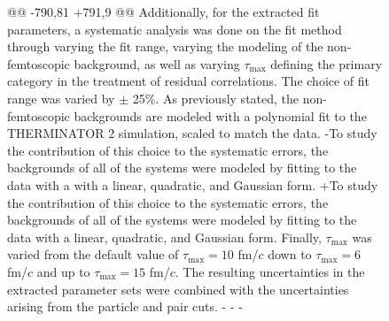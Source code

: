 \begin{figure}[h]
{@@ -790,81 +791,9 @@
 Additionally, for the extracted fit parameters, a systematic analysis was done on the fit method through varying the \kstar fit range, varying the modeling of the non-femtoscopic background, as well as varying $\tau_{\mathrm{max}}$ defining the primary category in the treatment of residual correlations.
 The choice of \kstar fit range was varied by $\pm$ 25\%. 
 As previously stated, the non-femtoscopic backgrounds are modeled with a polynomial fit to the THERMINATOR 2 simulation, scaled to match the data.
-To study the contribution of this choice to the systematic errors, the backgrounds of all of the systems were modeled by fitting to the data with a with a linear, quadratic, and Gaussian form.
+To study the contribution of this choice to the systematic errors, the backgrounds of all of the systems were modeled by fitting to the data with a linear, quadratic, and Gaussian form.
 Finally, $\tau_{\mathrm{max}}$ was varied from the default value of $\tau_{\mathrm{max}} = 10$ fm/$c$ down to $\tau_{\mathrm{max}} = 6$ fm/$c$ and up to $\tau_{\mathrm{max}} = 15$ fm/$c$.
 The resulting uncertainties in the extracted parameter sets were combined with the uncertainties arising from the particle and pair cuts.
-
-%
-\begin{comment}
-\begin{table}[htbp]
- \centering 
-  \renewcommand{\arraystretch}{1.2}
-  \begin{tabular}{|l|r|}
-   \multicolumn{2}{c}{\LamKs systematics} \\
-   \hline  
-   DCA to PV \LamALam & $<$ [0.4, 0.5, 0.6] cm \\
-   \hline
-   DCA to PV \Ks & $<$ [0.2, 0.3, 0.4] cm \\
-   \hline
-   DCA \LamALam Daughters & $<$ [0.3, 0.4, 0.5] cm \\
-   \hline
-   DCA \Ks Daughters & $<$ [0.2, 0.3, 0.4] cm \\
-   \hline
-   $\cos(\theta_{PA})$ \LamALam to PV & $>$ [0.9992, 0.9993, 0.9994] \\
-   \hline
-   $\cos(\theta_{PA})$ \Ks to PV & $>$ [0.9992, 0.9993, 0.9994] \\
-   \hline
-   DCA to PV of $\mathrm{p}\,(\overline{\mathrm{p}})$ Daughter of \LamALam & $>$ [0.05, 0.1, 0.2] cm \\
-   \hline
-   DCA to PV of $\pi^{-}$($\pi^{+}$) Daughter of \LamALam & $>$ [0.2, 0.3, 0.4] cm \\ 

\end{comment}}
\end{figure}
